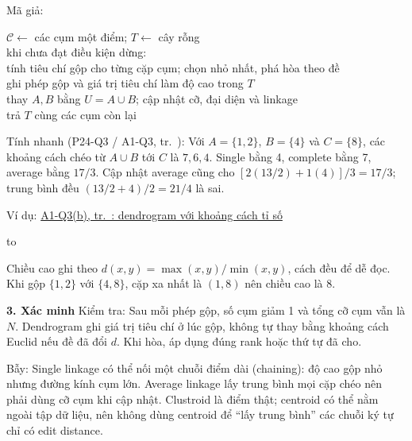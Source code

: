 \documentclass[10pt,a4paper,twocolumn]{article}
\makeatletter
\newcommand{\key}[1]{#1:\enspace}
\newcommand{\blocklabel}[1]{\par\noindent#1\par\nobreak}
\newcommand{\qlink}[2]{\hyperref[question:#1]{#2}}
\newenvironment{example}[2]{%
  \par\addvspace{6pt}\noindent
  \raggedright
  \blocklabel{Ví dụ: \qlink{#1}{#2}}%
}{\par\addvspace{4pt}}
\newenvironment{diagram}{%
  \par\addvspace{3pt}\noindent\hbox to \linewidth\bgroup\hfil
}{\hfil\egroup\par\addvspace{3pt}}
\newcommand{\unitheading}[2]{%
  \par\addvspace{1pt}\noindent\textbf{#1. #2}\enspace}
\newcommand{\unitverification}{\unitheading{3}{Xác minh}}
\newenvironment{algpseudo}{%
  \par\addvspace{2pt}\noindent
  \setlength{\parskip}{0pt}%
  Mã giả:\par\nobreak
  \begin{list}{}{\setlength{\leftmargin}{1em}\setlength{\topsep}{0pt}%
    \setlength{\partopsep}{0pt}\setlength{\parsep}{0pt}%
    \@beginparpenalty=10000\relax}%
  \item\relax
}{\end{list}\par\addvspace{3pt}}
\makeatother
\begin{document}
\begin{algpseudo}
$\mathcal C\gets$ các cụm một điểm; $T\gets$ cây rỗng\\
khi chưa đạt điều kiện dừng:\\
\quad tính tiêu chí gộp cho từng cặp cụm; chọn nhỏ nhất, phá hòa theo đề\\
\quad ghi phép gộp và giá trị tiêu chí làm độ cao trong $T$\\
\quad thay $A,B$ bằng $U=A\cup B$; cập nhật cỡ, đại diện và linkage\\
trả $T$ cùng các cụm còn lại
\end{algpseudo}

\key{Tính nhanh (P24-Q3 / A1-Q3, tr.~\pageref*{question:P24-Q3})} Với $A=\{1,2\}$, $B=\{4\}$ và $C=\{8\}$, các khoảng cách chéo từ $A\cup B$ tới $C$ là $7,6,4$. Single bằng 4, complete bằng 7, average bằng $17/3$. Cập nhật average cũng cho $[2(13/2)+1(4)]/3=17/3$; trung bình đều $(13/2+4)/2=21/4$ là sai.

\begin{example}{A1-Q3}{A1-Q3(b), tr.~\pageref*{question:A1-Q3}: dendrogram với khoảng cách tỉ số}
\begin{diagram}
\end{diagram}
Chiều cao ghi theo $d(x,y)=\max(x,y)/\min(x,y)$, cách đều để dễ đọc. Khi gộp $\{1,2\}$ với $\{4,8\}$, cặp xa nhất là $(1,8)$ nên chiều cao là $8$.
\end{example}


\unitverification
\key{Kiểm tra} Sau mỗi phép gộp, số cụm giảm 1 và tổng cỡ cụm vẫn là $N$. Dendrogram ghi giá trị tiêu chí ở lúc gộp, không tự thay bằng khoảng cách Euclid nếu đề đã đổi $d$. Khi hòa, áp dụng đúng rank hoặc thứ tự đã cho.

\key{Bẫy} Single linkage có thể nối một chuỗi điểm dài (chaining): độ cao gộp nhỏ nhưng đường kính cụm lớn. Average linkage lấy trung bình mọi cặp chéo nên phải dùng cỡ cụm khi cập nhật. Clustroid là điểm thật; centroid có thể nằm ngoài tập dữ liệu, nên không dùng centroid để ``lấy trung bình'' các chuỗi ký tự chỉ có edit distance.
\end{document}
